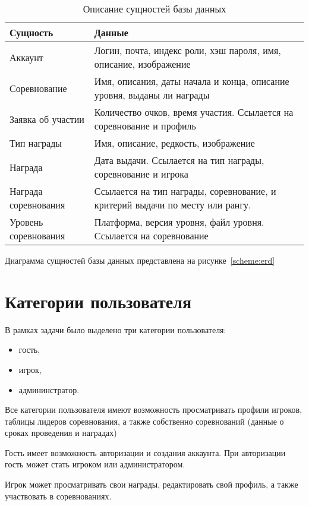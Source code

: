\begin{table}[h!]
	\centering
	\caption{\label{tbl:dataop}Описание сущностей базы данных}
	\begin{tabular}{|l|p{8cm}|}
		\hline
		Сущность & Данные \\\hline
		Аккаунт & Логин, почта, индекс роли, хэш пароля, имя, описание, изображение \\\hline
		Соревнование & Имя, описания, даты начала и конца, описание уровня, выданы ли награды \\\hline
		Заявка об участии & Количество очков, время участия. Ссылается на соревнование и профиль \\\hline
		Тип награды & Имя, описание, редкость, изображение\\\hline
		Награда & Дата выдачи. Ссылается на тип награды, соревнование и игрока \\\hline
		Награда соревнования & Ссылается на тип награды, соревнование, и критерий выдачи по месту или рангу.\\\hline
		Уровень соревнования & Платформа, версия уровня, файл уровня. Ссылается на соревнование\\\hline
	\end{tabular}
\end{table}
\FloatBarrier
Диаграмма сущностей базы данных представлена на рисунке~\ref{scheme:erd}

\FloatBarrier
\section{Категории пользователя}

В рамках задачи было выделено три категории пользователя:
\begin{itemize}
	\item гость,
	\item игрок,
	\item админинстратор.
\end{itemize}

Все категории пользователя имеют возможность просматривать профили игроков, таблицы лидеров соревнования, а также собственно соревнований (данные о сроках проведения и наградах)

Гость имеет возможность авторизации и создания аккаунта. При авторизации гость может стать игроком или администратором.

Игрок может просматривать свои награды, редактировать свой профиль, а также участвовать в соревнованиях.


